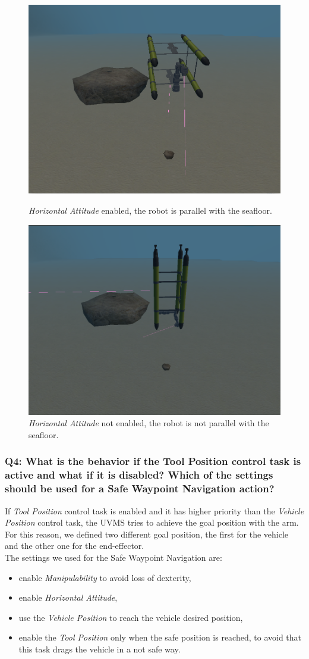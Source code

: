 \documentclass{article}
\begin{document}
\begin{figure}[!htb]
\centering
\includegraphics[width=.5\textwidth]{112_HAenabled.png}\caption{\textit{Horizontal Attitude} enabled, the robot is parallel with the seafloor.}
\label{fig:hae}
\vspace{5px}
\centering
\includegraphics[width=.5\textwidth]{112_HANotenabled.png}\caption{\textit{Horizontal Attitude} not enabled, the robot is not parallel with the seafloor.}
\label{fig:hane}
\end{figure}


\subsubsection{Q4: What is the behavior if the Tool Position control task is active and what if it is disabled? Which of the settings should be used for a Safe Waypoint Navigation action?}
If \textit{Tool Position} control task is enabled and it has higher priority than the \textit{Vehicle Position} control task, the UVMS tries to achieve the goal position with the arm. \\
For this reason, we defined two different goal position, the first for the vehicle and the other one for the end-effector. \\
The settings we used for the Safe Waypoint Navigation are:
\begin{itemize}
\item enable \textit{Manipulability} to avoid loss of dexterity,
\item enable \textit{Horizontal Attitude},
\item use the \textit{Vehicle Position} to reach the vehicle desired position,
\item enable the \textit{Tool Position} only when the safe position is reached, to avoid that this task drags the vehicle in a not safe way. 
\end{itemize}
\clearpage
\end{document}
